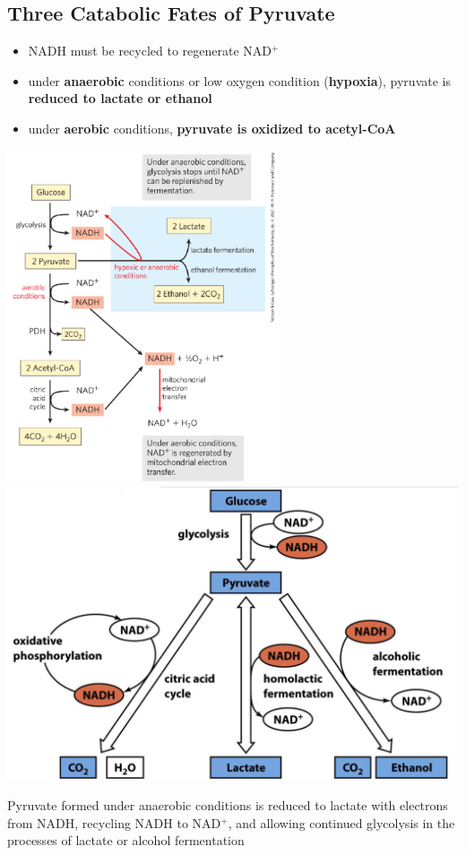 \documentclass[10pt]{article}
\newcommand{\pc}{$^+$}
\begin{document}
\subsection*{Three Catabolic Fates of Pyruvate}
\begin{itemize}
	\item NADH must be recycled to regenerate NAD\pc
	\item under \textbf{anaerobic} conditions or low oxygen condition (\textbf{hypoxia}), pyruvate is \textbf{reduced to lactate or ethanol}
	\item under \textbf{aerobic} conditions, \textbf{pyruvate is oxidized to acetyl-CoA}
\end{itemize}
\begin{center} 
    \includegraphics*[width=0.6\textwidth]{L2_7.png}\\
    \includegraphics*[width=\textwidth]{L2_8.png}
\end{center}
Pyruvate formed under anaerobic conditions is reduced to lactate with electrons from NADH, recycling NADH to NAD\pc, and allowing continued glycolysis in the processes of lactate or alcohol fermentation
\end{document}
